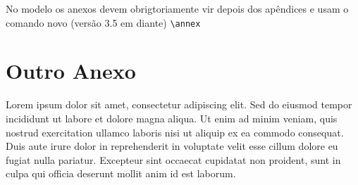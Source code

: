 \documentclass[dsc,pdfa,setavermelha]{ufrj}
\theoremstyle{plain}
\theoremstyle{definition}
\theoremstyle{remark}
\begin{document}
No modelo \CoppeTeX os anexos devem obrigtoriamente vir depois dos apêndices e usam o comando novo (versão 3.5 em diante) \verb|\annex|

\chapter{Outro Anexo}

Lorem ipsum dolor sit amet, consectetur adipiscing elit. Sed do eiusmod tempor incididunt ut labore et dolore magna aliqua. Ut enim ad minim veniam, quis nostrud exercitation ullamco laboris nisi ut aliquip ex ea commodo consequat. Duis aute irure dolor in reprehenderit in voluptate velit esse cillum dolore eu fugiat nulla pariatur. Excepteur sint occaecat cupidatat non proident, sunt in culpa qui officia deserunt mollit anim id est laborum.

\renewcommand{\indexname}{Índice de Assuntos}
\printindex

\ufrjfinalpage%
\end{document}
